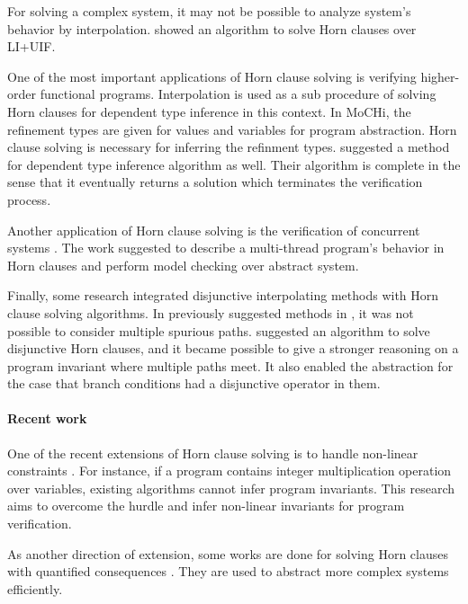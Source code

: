 For solving a complex system, it may not be possible to analyze
system's behavior by interpolation.  \cite{conf/aplas/GuptaPR11}
showed an algorithm to solve Horn clauses over LI+UIF.

One of the most important applications of Horn clause solving is
verifying higher-order functional programs.  Interpolation is used as
a sub procedure of solving Horn clauses for dependent type
inference \cite{conf/ppdp/UnnoK09, conf/pepm/SatoUK13} in this
context. In MoCHi, the refinement types are given for values and
variables for program abstraction.  Horn clause solving is necessary
for inferring the refinment types.  \cite{conf/popl/Terauchi10}
suggested a method for dependent type inference algorithm as
well. Their algorithm is complete in the sense that it eventually
returns a solution which terminates the verification process.

Another application of Horn clause solving is the verification of
concurrent systems \cite{conf/popl/GuptaPR11}. The work suggested to
describe a multi-thread program's behavior in Horn clauses and perform
model checking over abstract system.

Finally, some research integrated disjunctive interpolating methods
with Horn clause solving algorithms.  In previously suggested methods
in \cite{conf/popl/HenzingerJMM04, conf/cav/McMillan06}, it was not
possible to consider multiple spurious
paths.  \cite{conf/cav/RummerHK13} suggested an algorithm to solve
disjunctive Horn clauses, and it became possible to give a stronger
reasoning on a program invariant where multiple paths meet.  It also
enabled the abstraction for the case that branch conditions had a
disjunctive operator in them.

\paragraph{Recent work}

One of the recent extensions of Horn clause solving is to handle
non-linear constraints \cite{conf/cav/DaiXZ13}.  For instance, if a
program contains integer multiplication operation over variables,
existing algorithms cannot infer program invariants.  This research
aims to overcome the hurdle and infer non-linear invariants for
program verification.

As another direction of extension, some works are done for solving
Horn clauses with quantified consequences \cite{conf/sas/BjornerMR13,
conf/cav/BeyenePR13}.  They are used to abstract more complex systems
efficiently.

